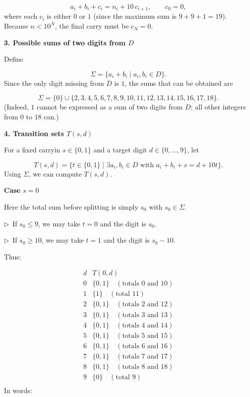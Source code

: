 \documentclass{llmxive}
\providecommand{\solutionheading}[1]{\par\smallskip\noindent\textbf{#1}\par}
\providecommand{\compactbullet}[1]{\par\noindent$\triangleright$~#1\par}
\begin{document}
\[
a_i + b_i + c_i = n_i + 10\,c_{i+1},\qquad c_0 = 0,
\]
where each \(c_i\) is either \(0\) or \(1\) (since the maximum sum is \(9+9+1 = 19\)). Because \(n < 10^N\), the final carry must be \(c_N = 0\).\par
\solutionheading{3. Possible sums of two digits from \(D\)}
Define\par
\[
\Sigma = \{ a_i+b_i \mid a_i,b_i \in D \}.
\]
Since the only digit missing from \(D\) is \(1\), the sums that can be obtained are\par
\[
\Sigma = \{0\} \cup \{2,3,4,5,6,7,8,9,10,11,12,13,14,15,16,17,18\}.
\]
(Indeed, \(1\) cannot be expressed as a sum of two digits from \(D\); all other integers from \(0\) to \(18\) can.)\par
\solutionheading{4. Transition sets \(T(s,d)\)}
For a fixed carryin \(s \in \{0,1\}\) and a target digit \(d \in \{0,\dots,9\}\), let\par
\[
T(s,d) = \bigl\{ t \in \{0,1\} \;\big|\; \exists a_i,b_i\in D \text{ with } a_i+b_i+s = d+10t \bigr\}.
\]
Using \(\Sigma\), we can compute \(T(s,d)\).\par
\solutionheading{Case \(s = 0\)}
Here the total sum before splitting is simply \(s_0\) with \(s_0 \in \Sigma\).\par
\compactbullet{If \(s_0 \le 9\), we may take \(t = 0\) and the digit is \(s_0\).}
\compactbullet{If \(s_0 \ge 10\), we may take \(t = 1\) and the digit is \(s_0-10\).}
Thus:\par
\[
\begin{array}{c|l}
d & T(0,d) \\ \hline
0 & \{0,1\} \quad (\text{totals }0\text{ and }10) \\
1 & \{1\} \quad (\text{total }11) \\
2 & \{0,1\} \quad (\text{totals }2\text{ and }12) \\
3 & \{0,1\} \quad (\text{totals }3\text{ and }13) \\
4 & \{0,1\} \quad (\text{totals }4\text{ and }14) \\
5 & \{0,1\} \quad (\text{totals }5\text{ and }15) \\
6 & \{0,1\} \quad (\text{totals }6\text{ and }16) \\
7 & \{0,1\} \quad (\text{totals }7\text{ and }17) \\
8 & \{0,1\} \quad (\text{totals }8\text{ and }18) \\
9 & \{0\} \quad (\text{total }9) \\
\end{array}
\]
In words:\par
\end{document}
